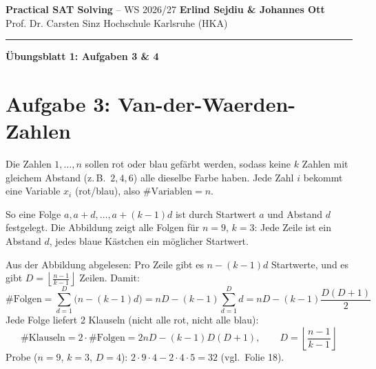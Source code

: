 \documentclass[11pt, a4paper]{article}
\begin{document}
\begin{flushleft}
    \textbf{Practical SAT Solving} -- WS 2026/27 \hfill \textbf{Erlind Sejdiu \& Johannes Ott}\\
    Prof. Dr. Carsten Sinz \hfill Hochschule Karlsruhe (HKA)\\
    \rule{\textwidth}{0.4pt}
\end{flushleft}

\begin{center}
    {\Large\bfseries Übungsblatt 1: Aufgaben 3 \& 4}
\end{center}
\vspace{0.2em}

\section*{Aufgabe 3: Van-der-Waerden-Zahlen}

Die Zahlen $1, \dots, n$ sollen rot oder blau gefärbt werden, sodass keine $k$ Zahlen mit gleichem Abstand (z.\,B.\ $2, 4, 6$) alle dieselbe Farbe haben. Jede Zahl $i$ bekommt eine Variable $x_i$ (rot/blau), also $\#\text{Variablen} = n$.

So eine Folge $a, a+d, \dots, a+(k-1)d$ ist durch Startwert $a$ und Abstand $d$ festgelegt. Die Abbildung zeigt alle Folgen für $n = 9$, $k = 3$: Jede Zeile ist ein Abstand $d$, jedes blaue Kästchen ein möglicher Startwert.

\begin{center}
\end{center}

Aus der Abbildung abgelesen: Pro Zeile gibt es $n - (k-1)d$ Startwerte, und es gibt $D = \left\lfloor \frac{n-1}{k-1} \right\rfloor$ Zeilen. Damit:
\begin{equation*}
    \#\text{Folgen} = \sum_{d=1}^{D} \bigl(n - (k-1)d\bigr) = nD - (k-1)\sum_{d=1}^{D} d = nD - (k-1)\frac{D(D+1)}{2}
\end{equation*}
Jede Folge liefert 2 Klauseln (nicht alle rot, nicht alle blau):
\begin{equation*}
    \boxed{\#\text{Klauseln} = 2 \cdot \#\text{Folgen} = 2nD - (k-1)D(D+1), \qquad D = \left\lfloor \frac{n-1}{k-1} \right\rfloor}
\end{equation*}
Probe ($n = 9$, $k = 3$, $D = 4$): $2 \cdot 9 \cdot 4 - 2 \cdot 4 \cdot 5 = 32$ (vgl.\ Folie 18).
\end{document}
